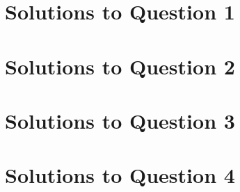\documentclass[a4paper,12pt]{article}
\begin{document}
\section{Solutions to Question 1}


\section{Solutions to Question 2}


\section{Solutions to Question 3}

\section{Solutions to Question 4}

\printbibliography
\end{document}
